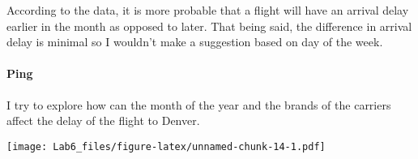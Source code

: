 \documentclass[]{article}
\newenvironment{Shaded}{\begin{snugshade}}{\end{snugshade}}
\newcommand{\KeywordTok}[1]{\textcolor[rgb]{0.13,0.29,0.53}{\textbf{#1}}}
\newcommand{\DataTypeTok}[1]{\textcolor[rgb]{0.13,0.29,0.53}{#1}}
\newcommand{\DecValTok}[1]{\textcolor[rgb]{0.00,0.00,0.81}{#1}}
\newcommand{\StringTok}[1]{\textcolor[rgb]{0.31,0.60,0.02}{#1}}
\newcommand{\OperatorTok}[1]{\textcolor[rgb]{0.81,0.36,0.00}{\textbf{#1}}}
\newcommand{\NormalTok}[1]{#1}
\let\oldparagraph\paragraph
\renewcommand{\paragraph}[1]{\oldparagraph{#1}\mbox{}}
\begin{document}
According to the data, it is more probable that a flight will have an
arrival delay earlier in the month as opposed to later. That being said,
the difference in arrival delay is minimal so I wouldn't make a
suggestion based on day of the week.

\paragraph{Ping}\label{ping-2}

I try to explore how can the month of the year and the brands of the
carriers affect the delay of the flight to Denver.

\begin{Shaded}
\end{Shaded}

\texttt{[image: Lab6\_files/figure-latex/unnamed-chunk-14-1.pdf]}
\end{document}
